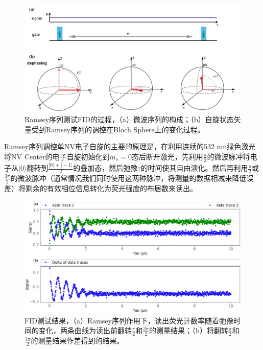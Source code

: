 \documentclass[type = bachelor]{whu-thesis}
\begin{document}
\begin{figure}
  \centering
  \includegraphics[width=1.0\textwidth]{figures/Chapter 1/FID_seq.png}
  \caption[Ramsey序列测试FID的过程]{Ramsey序列测试FID的过程，（a）微波序列的构成；（b）自旋状态矢量受到Ramsey序列的调控在Bloch Sphere上的变化过程\cite{新型扫描量子传感显微镜系统的研发与应用}。}
  \label{fig: FID_seq}
\end{figure}
Ramsey序列调控单NV电子自旋的主要的原理是，在利用连续的532 nm绿色激光将NV Center的电子自旋初始化到$m_s = 0$态后断开激光，先利用$\frac{\pi}{2}$的微波脉冲将电子从$|0\rangle$翻转到$\frac{|0\rangle+|-1\rangle}{2}$的叠加态，然后弛豫$\tau$的时间使其自由演化。然后再利用$\frac{\pi}{2}$或$\frac{3\pi}{2}$的微波脉冲（通常情况我们同时使用这两种脉冲，将测量的数据相减来降低误差）将剩余的有效相位信息转化为荧光强度的布居数来读出。

\begin{figure}
  \centering
  \includegraphics[width=1.0\textwidth]{figures/Chapter 1/FID Result.png}
  \caption[FID测试结果]{FID测试结果，（a）Ramsey序列作用下，读出荧光计数率随着弛豫时间的变化，两条曲线为读出前翻转$\frac{\pi}{2}$和$\frac{3\pi}{2}$的测量结果；（b）将翻转$\frac{\pi}{2}$和$\frac{3\pi}{2}$的测量结果作差得到的结果。}
  \label{fig: FID Result}
\end{figure}
\end{document}
